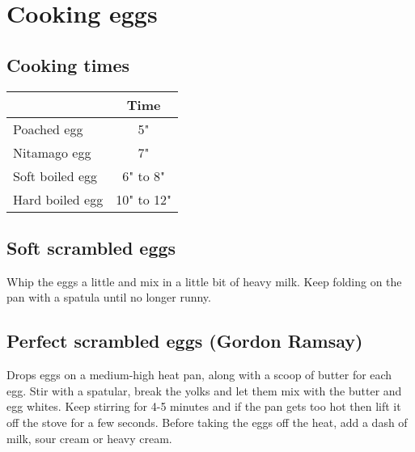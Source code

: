 \documentclass[10pt]{book}
\begin{document}


\newpage
\section*{Cooking eggs}

\subsection*{Cooking times}

\begin{center}
\begin{tabular}{l | c}
 & Time \\
\hline
Poached egg & 5" \\
Nitamago egg & 7" \\
Soft boiled egg & 6" to 8" \\
Hard boiled egg & 10" to 12" \\
\end{tabular}
\end{center}

\subsection*{Soft scrambled eggs}

Whip the eggs a little and mix in a little bit of heavy milk. Keep folding on the pan with a spatula until no longer runny.

\subsection*{Perfect scrambled eggs (Gordon Ramsay)}

Drops eggs on a medium-high heat pan, along with a scoop of butter for each egg. Stir with a spatular, break the yolks and let them mix with the butter and egg whites. Keep stirring for 4-5 minutes and if the pan gets too hot then lift it off the stove for a few seconds. Before taking the eggs off the heat, add a dash of milk, sour cream or heavy cream.
\end{document}
